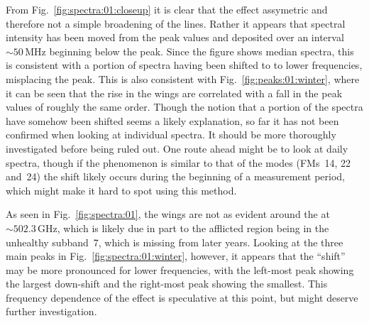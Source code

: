 From Fig.~\ref{fig:spectra:01:closeup} it is clear that the effect assymetric
and therefore not a simple broadening of the lines.  Rather it appears that
spectral intensity has been moved from the peak values and deposited over an
interval $\sim50\,\mathrm{MHz}$ beginning below the peak.  Since the figure
shows median spectra, this is consistent with a portion of spectra having been
shifted to to lower frequencies, misplacing the peak.  This is also consistent
with Fig.~\ref{fig:peaks:01:winter}, where it can be seen that the rise in the
wings are correlated with a fall in the peak values of roughly the same order.
Though the notion that a portion of the spectra have somehow been shifted seems
a likely explanation, so far it has not been confirmed when looking at
individual spectra.  It should be more thoroughly investigated before being
ruled out.  One route ahead might be to look at daily spectra, though if the
phenomenon is similar to that of the  modes (FMs~14, 22 and~24) the
shift likely occurs during the beginning of a measurement period, which might
make it hard to spot using this method.

As seen in Fig.~\ref{fig:spectra:01}, the wings are not as evident around the
 at $\sim502.3\,\mathrm{GHz}$, which is likely due in part to the
afflicted region being in the unhealthy subband~7, which is missing from later
years.  Looking at the three main peaks in Fig.~\ref{fig:spectra:01:winter},
however, it appears that the ``shift'' may be more pronounced for lower
frequencies, with the left-most  peak showing the largest down-shift
and the right-most  peak showing the smallest.  This frequency
dependence of the effect is speculative at this point, but might deserve
further investigation.
